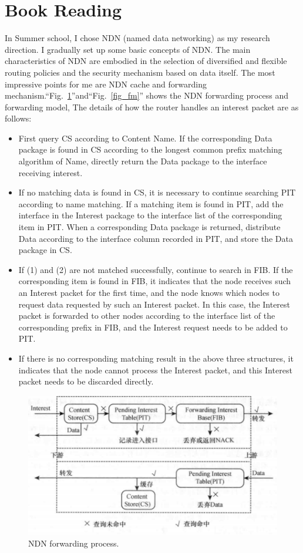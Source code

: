 \documentclass[conference]{IEEEtran}
\begin{document}
\section{Book Reading}
In Summer school, I chose NDN (named data networking) as my research direction. I gradually set up some basic concepts of NDN. The main characteristics of NDN are embodied in the selection of diversified and flexible routing policies and the security mechanism based on data itself\cite{b1}. The most impressive points for me are NDN cache and forwarding mechanism.``Fig.~\ref{fig_fp}''and``Fig.~\ref{fig_fm}'' shows the NDN forwarding process and forwarding model, The details of how the router handles an interest packet are as follows:
\begin{itemize}
\item  First query CS according to Content Name. If the corresponding  Data package is found in CS according to the longest common prefix matching algorithm of Name, directly return the Data package to the interface receiving interest.
\item
If no matching data is found in CS, it is necessary to continue searching PIT according to name matching. If a matching item is found in PIT, add the interface in the Interest package to the interface list of the corresponding item in PIT. When a corresponding Data package is returned, distribute Data according to the interface column recorded in PIT, and store the Data package in CS.
\item
If (1) and (2) are not matched successfully, continue to search in FIB. If the corresponding item is found in FIB, it indicates that the node receives such an Interest packet for the first time, and the node knows which nodes to request data requested by such an Interest packet. In this case, the Interest packet is forwarded to other nodes according to the interface list of the corresponding prefix in FIB, and the Interest request needs to be added to PIT.
\item
 If there is no corresponding matching result in the above three structures, it indicates that the node cannot process the Interest packet, and this Interest packet needs to be discarded directly.
\end{itemize}

\begin{figure}[htbp]
\centerline{\includegraphics[scale=0.75]{fig_fp.png}}
\caption{NDN forwarding process.}
\label{fig_fp}
\end{figure}
\end{document}

